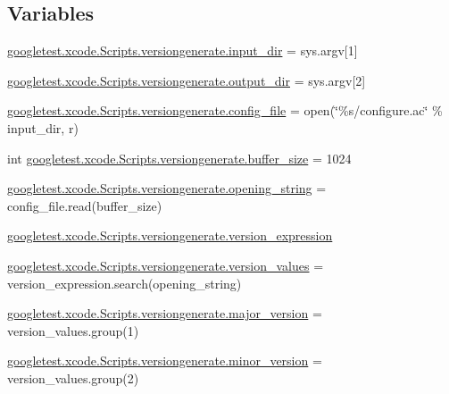 \subsection*{Variables}
\begin{DoxyCompactItemize}
\item 
\mbox{\hyperlink{namespacegoogletest_1_1xcode_1_1_scripts_1_1versiongenerate_a3748e6ed5fa3fe01c597805ad37d9600}{googletest.\+xcode.\+Scripts.\+versiongenerate.\+input\+\_\+dir}} = sys.\+argv\mbox{[}1\mbox{]}
\item 
\mbox{\hyperlink{namespacegoogletest_1_1xcode_1_1_scripts_1_1versiongenerate_a138e5c4be443480d16c8b2f974deec78}{googletest.\+xcode.\+Scripts.\+versiongenerate.\+output\+\_\+dir}} = sys.\+argv\mbox{[}2\mbox{]}
\item 
\mbox{\hyperlink{namespacegoogletest_1_1xcode_1_1_scripts_1_1versiongenerate_ac4026359183baf7e80f13e280faf2e21}{googletest.\+xcode.\+Scripts.\+versiongenerate.\+config\+\_\+file}} = open(\char`\"{}\%s/configure.\+ac\char`\"{} \% input\+\_\+dir, \textquotesingle{}r\textquotesingle{})
\item 
int \mbox{\hyperlink{namespacegoogletest_1_1xcode_1_1_scripts_1_1versiongenerate_a940807ec879f248f6ae06617bd4e24ac}{googletest.\+xcode.\+Scripts.\+versiongenerate.\+buffer\+\_\+size}} = 1024
\item 
\mbox{\hyperlink{namespacegoogletest_1_1xcode_1_1_scripts_1_1versiongenerate_a3428413265d3871efc361a80baf20932}{googletest.\+xcode.\+Scripts.\+versiongenerate.\+opening\+\_\+string}} = config\+\_\+file.\+read(buffer\+\_\+size)
\item 
\mbox{\hyperlink{namespacegoogletest_1_1xcode_1_1_scripts_1_1versiongenerate_a8c376adfce601225015c8aef7d35fb9e}{googletest.\+xcode.\+Scripts.\+versiongenerate.\+version\+\_\+expression}}
\item 
\mbox{\hyperlink{namespacegoogletest_1_1xcode_1_1_scripts_1_1versiongenerate_ad500e7c3500c15a782efcdfafd3d6d01}{googletest.\+xcode.\+Scripts.\+versiongenerate.\+version\+\_\+values}} = version\+\_\+expression.\+search(opening\+\_\+string)
\item 
\mbox{\hyperlink{namespacegoogletest_1_1xcode_1_1_scripts_1_1versiongenerate_a8a81689c7b037837d4960a3a4c89c227}{googletest.\+xcode.\+Scripts.\+versiongenerate.\+major\+\_\+version}} = version\+\_\+values.\+group(1)
\item 
\mbox{\hyperlink{namespacegoogletest_1_1xcode_1_1_scripts_1_1versiongenerate_ae0096f88d858abd95bcc24af5b565512}{googletest.\+xcode.\+Scripts.\+versiongenerate.\+minor\+\_\+version}} = version\+\_\+values.\+group(2)

\end{DoxyCompactItemize}

